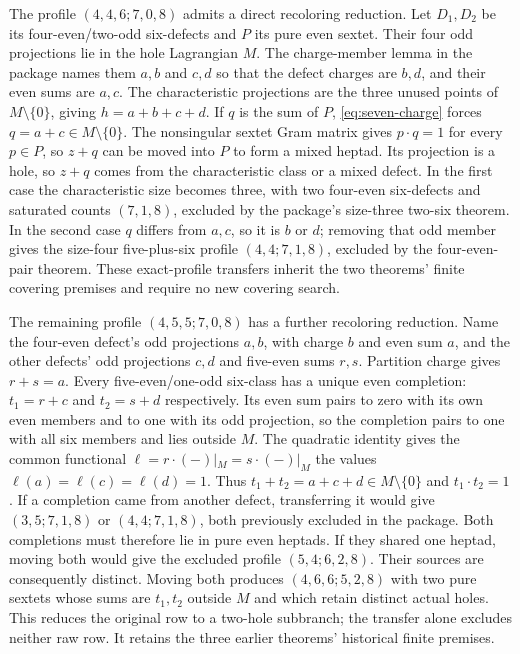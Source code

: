 The profile $(4,4,6;7,0,8)$ admits a direct recoloring reduction.
Let $D_1,D_2$ be its four-even/two-odd six-defects and $P$ its
pure even sextet. Their four odd projections lie in the hole
Lagrangian $M$. The charge-member lemma in the package names
them $a,b$ and $c,d$ so that the defect charges are $b,d$,
and their even sums are $a,c$. The characteristic projections
are the three unused points of $M\setminus\{0\}$, giving
$h=a+b+c+d$. If $q$ is the sum of $P$,
\eqref{eq:seven-charge} forces $q=a+c\in M\setminus\{0\}$.
The nonsingular sextet Gram matrix gives $p\cdot q=1$ for every
$p\in P$, so $z+q$ can be moved into $P$ to form a mixed heptad.
Its projection is a hole, so $z+q$ comes from the characteristic
class or a mixed defect. In the first case the characteristic
size becomes three, with two four-even six-defects and saturated
counts $(7,1,8)$, excluded by the package's size-three two-six
theorem. In the second case $q$ differs from $a,c$, so it is
$b$ or $d$; removing that odd member gives the size-four
five-plus-six profile $(4,4;7,1,8)$, excluded by the four-even-pair
theorem. These exact-profile transfers inherit the two theorems'
finite covering premises and require no new covering search.

The remaining profile $(4,5,5;7,0,8)$ has a further recoloring
reduction. Name the four-even defect's odd projections $a,b$,
with charge $b$ and even sum $a$, and the other defects' odd
projections $c,d$ and five-even sums $r,s$. Partition charge gives
$r+s=a$. Every five-even/one-odd six-class has a unique even
completion: $t_1=r+c$ and $t_2=s+d$ respectively. Its even sum
pairs to zero with its own even members and to one with its odd
projection, so the completion pairs to one with all six members
and lies outside $M$. The quadratic identity gives the common
functional $\ell=r\cdot(-)|_M=s\cdot(-)|_M$ the values
$\ell(a)=\ell(c)=\ell(d)=1$. Thus
$t_1+t_2=a+c+d\in M\setminus\{0\}$ and $t_1\cdot t_2=1$.
If a completion came from another defect, transferring it would
give $(3,5;7,1,8)$ or $(4,4;7,1,8)$, both previously excluded in
the package. Both completions must therefore lie in pure even
heptads. If they shared one heptad, moving both would give the
excluded profile $(5,4;6,2,8)$. Their sources are consequently
distinct. Moving both produces $(4,6,6;5,2,8)$ with two pure
sextets whose sums are $t_1,t_2$ outside $M$ and which retain
distinct actual holes. This reduces the original row to a two-hole
subbranch; the transfer alone excludes neither raw row. It retains the three earlier
theorems' historical finite premises.

